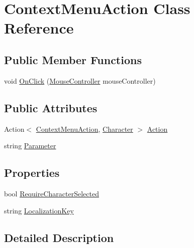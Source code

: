 \hypertarget{class_context_menu_action}{}\section{Context\+Menu\+Action Class Reference}
\label{class_context_menu_action}
\subsection*{Public Member Functions}
\begin{DoxyCompactItemize}
\item 
void \hyperlink{class_context_menu_action_a92e3d6b96a0bf30ae022298327b2658c}{On\+Click} (\hyperlink{class_mouse_controller}{Mouse\+Controller} mouse\+Controller)
\end{DoxyCompactItemize}
\subsection*{Public Attributes}
\begin{DoxyCompactItemize}
\item 
Action$<$ \hyperlink{class_context_menu_action}{Context\+Menu\+Action}, \hyperlink{class_project_porcupine_1_1_entities_1_1_character}{Character} $>$ \hyperlink{class_context_menu_action_a94571f3af1ba0a5f3e62d8ce6eece11a}{Action}
\item 
string \hyperlink{class_context_menu_action_a9755365125a54840753c035e69666673}{Parameter}
\end{DoxyCompactItemize}
\subsection*{Properties}
\begin{DoxyCompactItemize}
\item 
bool \hyperlink{class_context_menu_action_a326d5fd6a09c3dbdaca2e75de5b35f21}{Require\+Character\+Selected}
\item 
string \hyperlink{class_context_menu_action_a0f5cf662245a05c9b723051118658ccb}{Localization\+Key}
\end{DoxyCompactItemize}


\subsection{Detailed Description}


